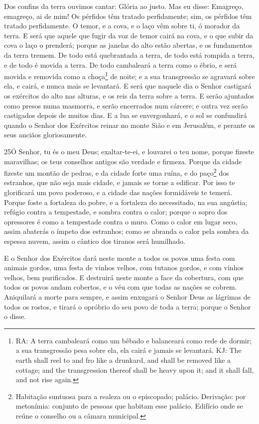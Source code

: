 Dos confins da terra ouvimos cantar: Glória ao justo. Mas eu
disse: Emagreço, emagreço, ai de mim! Os pérfidos têm tratado
perfidamente; sim, os pérfidos têm tratado perfidamente. O
temor, e a cova, e o laço vêm sobre ti, ó morador da terra. E
será que aquele que fugir da voz de temor cairá na cova, e o que
subir da cova o laço o prenderá; porque as janelas do alto estão
abertas, e os fundamentos da terra tremem. De todo está
quebrantada a terra, de todo está rompida a terra, e de todo é
movida a terra. De todo cambaleará a terra como o ébrio, e
será movida e removida como a choça\footnote{RA: A terra cambaleará
como um bêbado e balanceará como rede de dormir; a sua transgressão
pesa sobre ela, ela cairá e jamais se levantará. KJ: The earth shall
reel to and fro like a drunkard, and shall be removed like a
cottage; and the transgression thereof shall be heavy upon it; and
it shall fall, and not rise again.} de noite; e a sua transgressão
se agravará sobre ela, e cairá, e nunca mais se levantará. E
será que naquele dia o Senhor castigará os exércitos do alto nas
alturas, e os reis da terra sobre a terra. E serão ajuntados
como presos numa masmorra, e serão encerrados num cárcere; e outra
vez serão castigados depois de muitos dias. E a lua se
envergonhará, e o sol se confundirá quando o Senhor dos Exércitos
reinar no monte Sião e em Jerusalém, e perante os seus anciãos
gloriosamente.

\medskip

\lettrine{25}{}Ó Senhor, tu és o meu Deus; exaltar-te-ei, e
louvarei o teu nome, porque fizeste maravilhas; os teus conselhos
antigos são verdade e firmeza. Porque da cidade fizeste um
montão de pedras, e da cidade forte uma ruína, e do
paço\footnote{Habitação suntuosa para a realeza ou o episcopado;
palácio. Derivação: por metonímia: conjunto de pessoas que habitam
esse palácio. Edifício onde se reúne o conselho ou a câmara
municipal.} dos estranhos, que não seja mais cidade, e jamais se
torne a edificar. Por isso te glorificará um povo poderoso, e a
cidade das nações formidáveis te temerá. Porque foste a
fortaleza do pobre, e a fortaleza do necessitado, na sua angústia;
refúgio contra a tempestade, e sombra contra o calor; porque o sopro
dos opressores é como a tempestade contra o muro. Como o calor
em lugar seco, assim abaterás o ímpeto dos estranhos; como se
abranda o calor pela sombra da espessa nuvem, assim o cântico dos
tiranos será humilhado.

E o Senhor dos Exércitos dará neste monte a todos os povos uma
festa com animais gordos, uma festa de vinhos velhos, com tutanos
gordos, e com vinhos velhos, bem purificados. E destruirá neste
monte a face da cobertura, com que todos os povos andam cobertos, e
o véu com que todas as nações se cobrem. Aniquilará a morte para
sempre, e assim enxugará o Senhor Deus as lágrimas de todos os
rostos, e tirará o opróbrio do seu povo de toda a terra; porque o
Senhor o disse.

